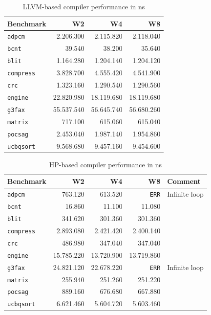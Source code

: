 \begin{table}
  \centering
    \begin{tabular}{|l|r|r|r|}
    \hline
    \textbf{Benchmark} & \multicolumn{1}{|r|}{\textbf{W2}} & \multicolumn{1}{|r|}{\textbf{W4}}  & \multicolumn{1}{|r|}{\textbf{W8}} \\ \hline
	\texttt{adpcm} 		&  2.206.300	&  2.115.820 	&  2.118.040 	\\ \hline
	\texttt{bcnt} 		&  39.540		&  38.200 		&  35.640 		\\ \hline
	\texttt{blit} 		&  1.164.280	&  1.204.140 	&  1.204.120 	\\ \hline
	\texttt{compress} 	&  3.828.700	&  4.555.420 	&  4.541.900 	\\ \hline
	\texttt{crc} 		&  1.323.160	&  1.290.540 	&  1.290.560 	\\ \hline
	\texttt{engine} 	&  22.820.980	&  18.119.680 	&  18.119.680 	\\ \hline
	\texttt{g3fax} 		&  55.537.540	&  56.645.740 	&  56.680.260 	\\ \hline
	\texttt{matrix} 	&  717.100		&  615.060 		&  615.040 		\\ \hline
	\texttt{pocsag} 	&  2.453.040	&  1.987.140 	&  1.954.860 	\\ \hline
	\texttt{ucbqsort} 	&  9.568.680	&  9.457.160 	&  9.454.600 	\\ \hline
    \end{tabular}
  \caption{LLVM-based compiler performance in ns}
  \label{tbl:LLVM_perf}
\end{table}

\begin{table}
  \centering
    \begin{tabular}{|l|r|r|r|l|}
    \hline
    \textbf{Benchmark} & \multicolumn{1}{|r|}{\textbf{W2}} & \multicolumn{1}{|r|}{\textbf{W4}}  & \multicolumn{1}{|r|}{\textbf{W8}} & \textbf{Comment} \\ \hline
	\texttt{adpcm} 		&   763.120 	&   613.520 	&   \texttt{ERR} 	& Infinite loop	\\ \hline
	\texttt{bcnt} 		&   16.860 		&   11.100 		&   11.080 			& 	\\ \hline
	\texttt{blit} 		&   341.620 	&   301.360 	&   301.360 		& 	\\ \hline
	\texttt{compress} 	&   2.893.080 	&   2.421.420 	&   2.400.140 		& 	\\ \hline
	\texttt{crc} 		&   486.980 	&   347.040 	&   347.040 		& 	\\ \hline
	\texttt{engine} 	&   15.785.220 	&   13.720.900 	&   13.719.860 		& 	\\ \hline
	\texttt{g3fax} 		&   24.821.120 	&   22.678.220 	&   \texttt{ERR} 	& Infinite loop	\\ \hline
	\texttt{matrix} 	&   255.940 	&   251.260 	&   251.220 		& 	\\ \hline
	\texttt{pocsag} 	&   889.160 	&   676.680 	&   667.880 		& 	\\ \hline
	\texttt{ucbqsort} 	&   6.621.460 	&   5.604.720 	&   5.603.460 		& 	\\ \hline
    \end{tabular}
  \caption{HP-based compiler performance in ns}
  \label{tbl:HP_perf}
\end{table}

